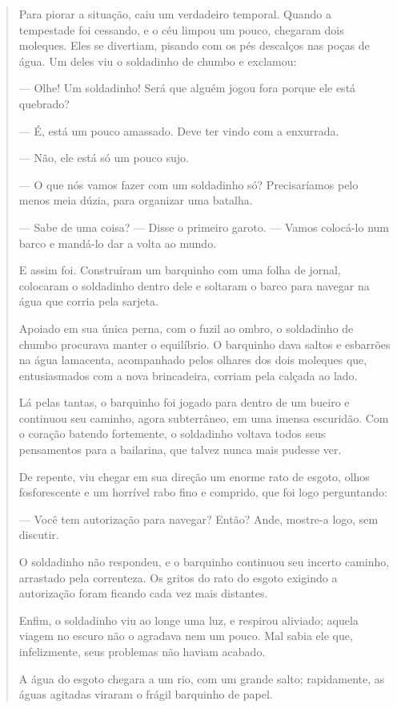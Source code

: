 \begin{conteudo}
\begin{conteudo}
\begin{conteudo}
\begin{conteudo}
\begin{quote}
Para piorar a situação, caiu um verdadeiro temporal. Quando a tempestade
foi cessando, e o céu limpou um pouco, chegaram dois moleques. Eles se
divertiam, pisando com os pés descalços nas poças de água. Um deles viu
o soldadinho de chumbo e exclamou:

--- Olhe! Um soldadinho! Será que alguém jogou fora porque ele está
quebrado?

--- É, está um pouco amassado. Deve ter vindo com a enxurrada.

--- Não, ele está só um pouco sujo.

--- O que nós vamos fazer com um soldadinho só? Precisaríamos pelo menos
meia dúzia, para organizar uma batalha.

--- Sabe de uma coisa? --- Disse o primeiro garoto. --- Vamos colocá-lo
num barco e mandá-lo dar a volta ao mundo.

E assim foi. Construíram um barquinho com uma folha de jornal, colocaram
o soldadinho dentro dele e soltaram o barco para navegar na água que
corria pela sarjeta.

Apoiado em sua única perna, com o fuzil ao ombro, o soldadinho de chumbo
procurava manter o equilíbrio. O barquinho dava saltos e esbarrões na
água lamacenta, acompanhado pelos olhares dos dois moleques que,
entusiasmados com a nova brincadeira, corriam pela calçada ao lado.

Lá pelas tantas, o barquinho foi jogado para dentro de um bueiro e
continuou seu caminho, agora subterrâneo, em uma imensa escuridão. Com o
coração batendo fortemente, o soldadinho voltava todos seus pensamentos
para a bailarina, que talvez nunca mais pudesse ver.

De repente, viu chegar em sua direção um enorme rato de esgoto, olhos
fosforescente e um horrível rabo fino e comprido, que foi logo
perguntando:

--- Você tem autorização para navegar? Então? Ande, mostre-a logo, sem
discutir.

O soldadinho não respondeu, e o barquinho continuou seu incerto caminho,
arrastado pela correnteza. Os gritos do rato do esgoto exigindo a
autorização foram ficando cada vez mais distantes.

Enfim, o soldadinho viu ao longe uma luz, e respirou aliviado; aquela
viagem no escuro não o agradava nem um pouco. Mal sabia ele que,
infelizmente, seus problemas não haviam acabado.

A água do esgoto chegara a um rio, com um grande salto; rapidamente, as
águas agitadas viraram o frágil barquinho de papel.


\end{quote}
\end{conteudo}
\end{conteudo}
\end{conteudo}
\end{conteudo}
